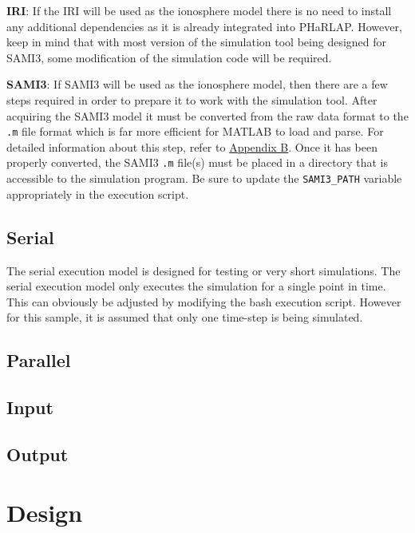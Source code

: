 \documentclass[12pt,letterpaper]{article}
\begin{document}
{\bf IRI}: If the IRI will be used as the ionosphere model there is no need to
install any additional dependencies as it is already integrated into
PHaRLAP. However, keep in mind that with most version of the simulation tool
being designed for SAMI3, some modification of the simulation code will be
required.

{\bf SAMI3}: If SAMI3 will be used as the ionosphere model, then there are a few
steps required in order to prepare it to work with the simulation tool. After
acquiring the SAMI3 model it must be converted from the raw data format to the
{\tt *.m} file format which is far more efficient for MATLAB to load and
parse. For detailed information about this step, refer to
\hyperref[sec:sami3_df]{Appendix B}. Once it has been properly converted, the
SAMI3 {\tt *.m} file(s) must be placed in a directory that is accessible to the
simulation program. Be sure to update the {\tt SAMI3\_PATH} variable
appropriately in the execution script.

\subsection{Serial}
\label{sec:usage:serial}

The serial execution model is designed for testing or very short
simulations. The serial execution model only executes the simulation for a
single point in time. This can obviously be adjusted by modifying the bash
execution script. However for this sample, it is assumed that only one time-step
is being simulated.

\subsection{Parallel}
\label{sec:usage:parallel}

\subsection{Input}
\label{sec:usage:input}

\subsection{Output}
\label{sec:usage:output}

%
%
\section{Design}
\label{sec:design}
\end{document}
